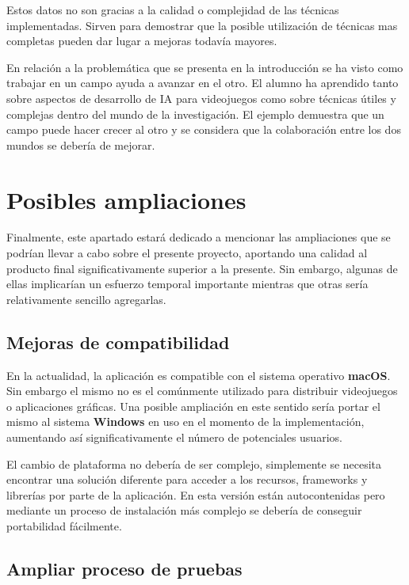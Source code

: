 \bigskip

Estos datos no son gracias a la calidad o complejidad de las técnicas implementadas. Sirven para demostrar que la posible utilización de técnicas mas completas pueden dar lugar a mejoras todavía mayores.

\bigskip

En relación a la problemática que se presenta en la introducción se ha visto como trabajar en un campo ayuda a avanzar en el otro. El alumno ha aprendido tanto sobre aspectos de desarrollo de IA para videojuegos como sobre técnicas útiles y complejas dentro del mundo de la investigación. El ejemplo demuestra que un campo puede hacer crecer al otro y se considera que la colaboración entre los dos mundos se debería de mejorar.


\section{Posibles ampliaciones}

Finalmente, este apartado estará dedicado a mencionar las ampliaciones que se podrían llevar a cabo sobre el presente proyecto, aportando una calidad al producto final significativamente superior a la presente. Sin embargo, algunas de ellas implicarían un esfuerzo temporal importante mientras que otras sería relativamente sencillo agregarlas.

\subsection{Mejoras de compatibilidad}

En la actualidad, la aplicación es compatible con el sistema operativo \textbf{macOS}. Sin embargo el mismo no es el comúnmente utilizado para distribuir videojuegos o aplicaciones gráficas. Una posible ampliación en este sentido sería portar el mismo al sistema \textbf{Windows} en uso en el momento de la implementación, aumentando así significativamente el número de potenciales usuarios.

\bigskip

El cambio de plataforma no debería de ser complejo, simplemente se necesita encontrar una solución diferente para acceder a los recursos, frameworks y librerías por parte de la aplicación. En esta versión están autocontenidas pero mediante un proceso de instalación más complejo se debería de conseguir portabilidad fácilmente.

\subsection{Ampliar proceso de pruebas}

